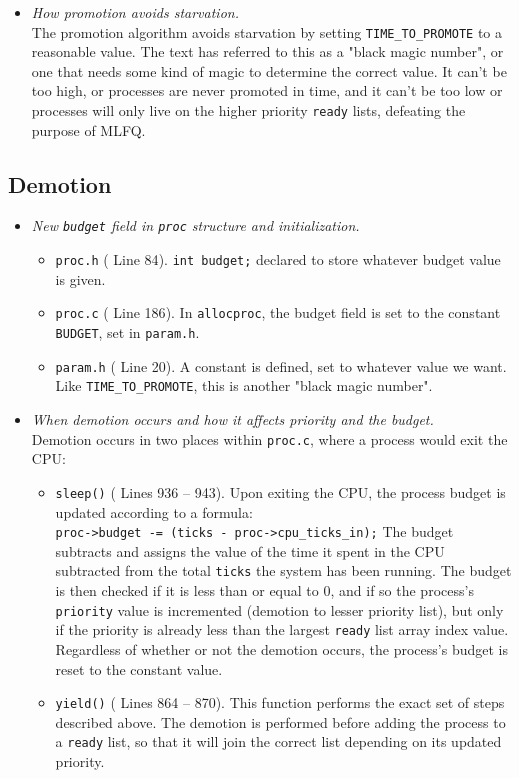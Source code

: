\documentclass[11pt,letterpaper]{report}
\begin{document}
\begin{itemize}
		\item \emph{How promotion avoids starvation.}\\
		The promotion algorithm avoids starvation by setting {\tt TIME\_TO\_PROMOTE} to a reasonable value. The text has referred to this as a "black magic number", or one that needs some kind of magic to determine the correct value. It can't be too high, or processes are never promoted in time, and it can't be too low or processes will only live on the higher priority {\tt ready} lists, defeating the purpose of MLFQ.
	\end{itemize}
	\newpage
	
	\subsection{Demotion}
	\begin{itemize}
		\item \emph{New {\tt budget} field in {\tt proc} structure and initialization.}
		\begin{itemize}
			\item {\tt proc.h} ({\color{red} Line 84}). {\tt int budget;} declared to store whatever budget value is given.
			\item {\tt proc.c} ({\color{red} Line 186}). In {\tt allocproc}, the budget field is set to the constant {\tt BUDGET}, set in {\tt param.h}.
			\item {\tt param.h} ({\color{red} Line 20}). A constant is defined, set to whatever value we want. Like {\tt TIME\_TO\_PROMOTE}, this is another "black magic number".
		\end{itemize}
	
		\item \emph{When demotion occurs and how it affects priority and the budget.}\\
		Demotion occurs in two places within {\tt proc.c}, where a process would exit the CPU:
		\begin{itemize}
			\item {\tt sleep()} ({\color{red} Lines 936 -- 943}). Upon exiting the CPU, the process budget is updated according to a formula:\\
			{\tt proc->budget -= (ticks - proc->cpu\_ticks\_in);}
			The budget subtracts and assigns the value of the time it spent in the CPU subtracted from the total {\tt ticks} the system has been running. The budget is then checked if it is less than or equal to 0, and if so the process's {\tt priority} value is incremented (demotion to lesser priority list), but only if the priority is already less than the largest {\tt ready} list array index value. Regardless of whether or not the demotion occurs, the process's budget is reset to the constant value.
			
			\item {\tt yield()} ({\color{red} Lines 864 -- 870}). This function performs the exact set of steps described above. The demotion is performed before adding the process to a {\tt ready} list, so that it will join the correct list depending on its updated priority.
		\end{itemize}
		
	\end{itemize}
	
\end{document}
